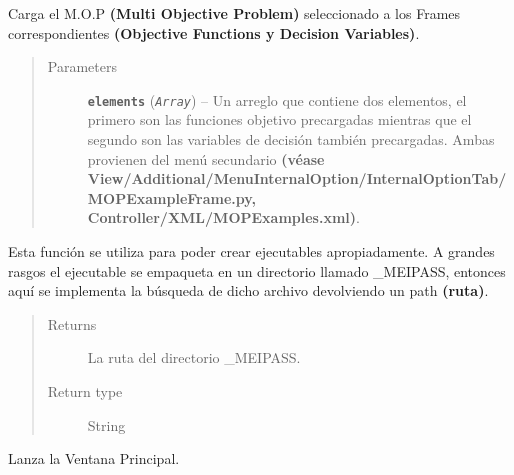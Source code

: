 \documentclass[letterpaper,10pt,english]{sphinxmanual}
\begin{document}
\begin{fulllineitems}
\begin{fulllineitems}
\begin{quote}
\begin{description}
\end{description}\end{quote}

\end{fulllineitems}


\begin{fulllineitems}
\label{View/MainWindow:View.MainWindow.MainWindow.load_mop_example}
Carga el M.O.P \textbf{(Multi Objective Problem)} seleccionado
a los Frames correspondientes \textbf{(Objective Functions y Decision Variables)}.
\begin{quote}\begin{description}
\item[{Parameters}] \leavevmode
\textbf{\texttt{elements}} (\emph{\texttt{Array}}) -- Un arreglo que contiene dos elementos, el primero son las
funciones objetivo precargadas mientras que el segundo son las
variables de decisión también precargadas. Ambas provienen del menú
secundario \textbf{(véase View/Additional/MenuInternalOption/InternalOptionTab/MOPExampleFrame.py,
Controller/XML/MOPExamples.xml)}.

\end{description}\end{quote}

\end{fulllineitems}


\begin{fulllineitems}
\label{View/MainWindow:View.MainWindow.MainWindow.resource_path}
Esta función se utiliza para poder crear ejecutables
apropiadamente.
A grandes rasgos el ejecutable se empaqueta en un directorio
llamado \_MEIPASS, entonces aquí se implementa la búsqueda
de dicho archivo devolviendo un path \textbf{(ruta)}.
\begin{quote}\begin{description}
\item[{Returns}] \leavevmode
La ruta del directorio \_MEIPASS.

\item[{Return type}] \leavevmode
String

\end{description}\end{quote}

\end{fulllineitems}


\begin{fulllineitems}
\label{View/MainWindow:View.MainWindow.MainWindow.run}
Lanza la Ventana Principal.

\end{fulllineitems}


\end{fulllineitems}
\end{document}
